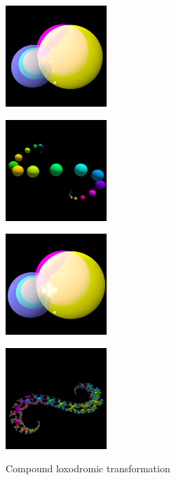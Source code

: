 \begin{figure}[h!tbp]
  \begin{minipage}{0.24\hsize}
   \center
   \includegraphics[width=1.5in, height=1.5in, keepaspectratio]{../img/klein/3diis/compLoxoOneGen.pdf}
   \label{fig:compLoxoGen}
  \end{minipage}
 \hspace*{\fill}
 \begin{minipage}{0.24\hsize}
  \center
  \includegraphics[width=1.5in, height=1.5in, keepaspectratio]{../img/klein/3diis/compLoxoOneOrb.pdf}
   \label{fig:compLoxoOrb}
 \end{minipage}
 \hspace*{\fill}
  \begin{minipage}{0.24\hsize}
   \center
   \includegraphics[width=1.5in, height=1.5in, keepaspectratio]{../img/klein/3diis/compLoxoGen.pdf}
   \label{fig:compLoxoGen}
  \end{minipage}
 \hspace*{\fill}
 \begin{minipage}{0.24\hsize}
  \center
  \includegraphics[width=1.5in, height=1.5in, keepaspectratio]{../img/klein/3diis/compLoxoOrb.pdf}
   \label{fig:compLoxoOrb}
 \end{minipage}
 \hspace*{\fill}
  \caption{Compound loxodromic transformation}
 \label{fig:compLoxo}
\end{figure}

